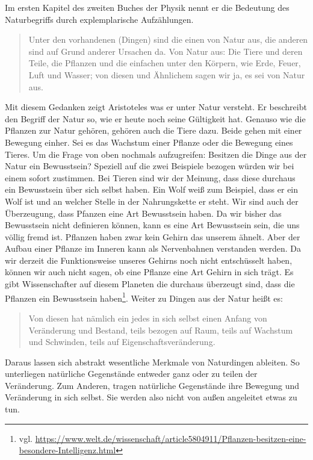 Im ersten Kapitel des zweiten Buches der Physik nennt er die Bedeutung des Naturbegriffs durch explemplarische Aufzählungen. 
\begin{quote}
	\glqq Unter den vorhandenen (Dingen) sind die einen von Natur aus, die anderen sind auf Grund anderer Ursachen da. Von
Natur aus: Die Tiere und deren Teile, die Pflanzen und die einfachen unter den Körpern, wie Erde, Feuer, Luft und
Wasser; von diesen und Ähnlichem sagen wir ja, es sei von Natur aus. \grqq{}
	\cite[192b8 ff.]{PhysikII} 
\end{quote}
Mit diesem Gedanken zeigt Aristoteles was er unter Natur versteht. Er beschreibt den Begriff der Natur so, wie er heute noch seine Gültigkeit hat. Genauso wie die Pflanzen zur Natur gehören, gehören auch die Tiere dazu. Beide gehen mit einer Bewegung einher. Sei es das Wachstum einer Pflanze oder die Bewegung eines Tieres. Um die Frage von oben nochmals aufzugreifen: Besitzen die Dinge aus der Natur ein Bewusstsein? Speziell auf die zwei Beispiele bezogen würden wir bei einem sofort zustimmen. Bei Tieren sind wir der Meinung, dass diese durchaus ein Bewusstsein über sich selbst haben. Ein Wolf weiß zum Beispiel, dass er ein Wolf ist und an welcher Stelle in der Nahrungskette er steht. Wir sind auch der Überzeugung, dass Pfanzen eine Art Bewusstsein haben. Da wir bisher das Bewusstsein nicht definieren können, kann es eine Art Bewusstsein sein, die uns völlig fremd ist. Pflanzen haben zwar kein Gehirn das unserem ähnelt. Aber der Aufbau einer Pflanze im Inneren kann als Nervenbahnen verstanden werden. Da wir derzeit die Funktionsweise unseres Gehirns noch nicht entschüsselt haben, können wir auch nicht sagen, ob eine Pflanze eine Art Gehirn in sich trägt. Es gibt Wissenschafter auf diesem Planeten die durchaus überzeugt sind, dass die Pflanzen ein Bewusstsein haben\footnote{ vgl. \url{https://www.welt.de/wissenschaft/article5804911/Pflanzen-besitzen-eine-besondere-Intelligenz.html}}.    
Weiter zu Dingen aus der Natur heißt es:
\begin{quote}
	\glqq Von diesen hat nämlich ein jedes in sich selbst einen Anfang von Veränderung und Bestand, teils bezogen auf Raum, teils auf Wachstum und Schwinden, teils auf Eigenschaftsveränderung. \grqq{}
	\cite[192b8 ff.]{PhysikII} 
\end{quote}
Daraus lassen sich abstrakt wesentliche Merkmale von \glqq Naturdingen\grqq{} ableiten. So unterliegen natürliche Gegenstände entweder ganz oder zu teilen der Veränderung. Zum Anderen, tragen natürliche Gegenstände ihre Bewegung und Veränderung in sich selbst. Sie werden also nicht von außen angeleitet etwas zu tun.

